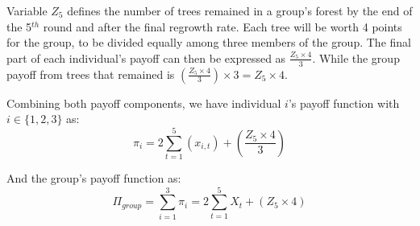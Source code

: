 \noindent Variable $Z_{5}$ defines the number of trees remained in a group's forest by the end of the 5$^{th}$ round and after the final regrowth rate. Each tree will be worth 4 points for the group, to be divided equally among three members of the group. The final part of each individual's payoff can then be expressed as $\frac{Z_{5} \times 4}{3}$. While the group payoff from trees that remained is $ \left(\frac{Z_{5} \times 4}{3}\right) \times 3 = Z_{5} \times {4}$.

\noindent Combining both payoff components, we have individual $i$'s payoff function with $i \in \{1,2,3\}$ as:
\begin{equation}
\label{eq:2}
    \pi_{i}=2\sum_{t=1}^{5} (x_{i,t})+\left( \frac{Z_{5} \times 4}{3} \right)
\end{equation}

\noindent And the group's payoff function as:
\begin{equation}
\label{eq:3}
    \Pi_{group} = \sum_{i=1}^{3} \pi_{i} = 2 \sum_{t=1}^{5} X_{t} + \left(Z_5 \times 4 \right)
\end{equation}
